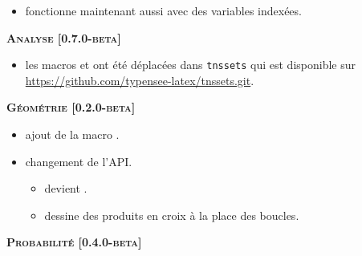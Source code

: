 \documentclass[12pt,a4paper]{book}
\begin{document}
\begin{description}
\begin{itemize}[itemsep=.5em]

    \item {}
           fonctionne maintenant aussi avec des variables indexées.
          
\end{itemize}


\begin{center}
    \textbf{\textsc{Analyse [0.7.0-beta]}}
\end{center}

\begin{itemize}[itemsep=.5em]
    \item {}
          les macros  et  ont été déplacées dans \verb#tnssets# qui est disponible sur \url{https://github.com/typensee-latex/tnssets.git}.
    
\end{itemize}


\separation




\begin{center}
    \textbf{\textsc{Géométrie [0.2.0-beta]}}
\end{center}

\begin{itemize}[itemsep=.5em]
    \item {}
          ajout de la macro .


    \item {} changement de l'API.
    \begin{itemize}[itemsep=.5em]
        \item {} devient .

        \item {} dessine des produits en croix à la place des boucles.
    \end{itemize}


\end{itemize}


\separation




\begin{center}
    \textbf{\textsc{Probabilité [0.4.0-beta]}}
\end{center}


\end{description}
\end{document}
